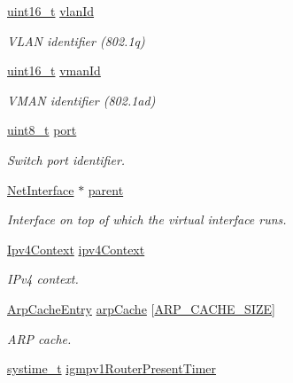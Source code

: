 \begin{DoxyCompactItemize}
\hyperlink{stdint_8h_a273cf69d639a59973b6019625df33e30}{uint16\+\_\+t} \hyperlink{struct__NetInterface_aa70d2a72cb266412abe9a9b447e65da3}{vlan\+Id}
\begin{DoxyCompactList}\small\item\em V\+L\+AN identifier (802.\+1q) \end{DoxyCompactList}\item 
\hyperlink{stdint_8h_a273cf69d639a59973b6019625df33e30}{uint16\+\_\+t} \hyperlink{struct__NetInterface_abed68dc5c574c089cffc3d1906928ea1}{vman\+Id}
\begin{DoxyCompactList}\small\item\em V\+M\+AN identifier (802.\+1ad) \end{DoxyCompactList}\item 
\hyperlink{stdint_8h_aba7bc1797add20fe3efdf37ced1182c5}{uint8\+\_\+t} \hyperlink{struct__NetInterface_a12788702d431231f9a54d2e2935f1d00}{port}
\begin{DoxyCompactList}\small\item\em Switch port identifier. \end{DoxyCompactList}\item 
\hyperlink{net_8h_a2234db8911a1148c9159979d8f5e0d6b}{Net\+Interface} $\ast$ \hyperlink{struct__NetInterface_ac581ac09560df4994af65724cb821c2f}{parent}
\begin{DoxyCompactList}\small\item\em Interface on top of which the virtual interface runs. \end{DoxyCompactList}\item 
\hyperlink{structIpv4Context}{Ipv4\+Context} \hyperlink{struct__NetInterface_abfe564ed4bf1a18d852612ad67b94d57}{ipv4\+Context}
\begin{DoxyCompactList}\small\item\em I\+Pv4 context. \end{DoxyCompactList}\item 
\hyperlink{structArpCacheEntry}{Arp\+Cache\+Entry} \hyperlink{struct__NetInterface_a758b74913c8a9563dda1a6cb8823ce15}{arp\+Cache} \mbox{[}\hyperlink{net__config_8h_adfc3bb356b0ae1244f95c2f191ee096e}{A\+R\+P\+\_\+\+C\+A\+C\+H\+E\+\_\+\+S\+I\+ZE}\mbox{]}
\begin{DoxyCompactList}\small\item\em A\+RP cache. \end{DoxyCompactList}\item 
\hyperlink{compiler__port_8h_ae3e32a98d431a02106616da3071832dd}{systime\+\_\+t} \hyperlink{struct__NetInterface_a1cbd92637a504270813b879f299bda40}{igmpv1\+Router\+Present\+Timer}

\end{DoxyCompactItemize}
